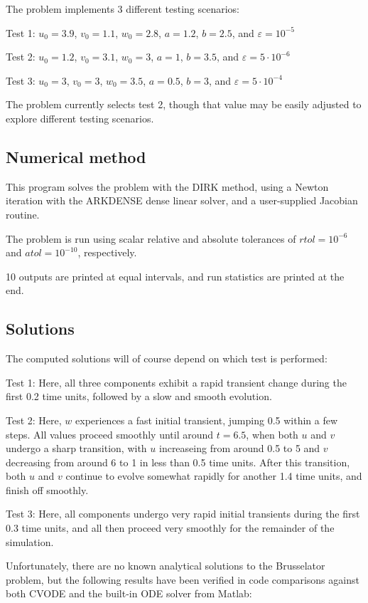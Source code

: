 \documentclass[letterpaper,10pt,english]{sphinxmanual}
\begin{document}
The problem implements 3 different testing scenarios:

Test 1:  $u_0=3.9$,  $v_0=1.1$,  $w_0=2.8$,
$a=1.2$, $b=2.5$, and $\varepsilon=10^{-5}$

Test 2:  $u_0=1.2$, $v_0=3.1$, $w_0=3$, $a=1$,
$b=3.5$, and $\varepsilon=5\cdot10^{-6}$

Test 3:  $u_0=3$, $v_0=3$, $w_0=3.5$, $a=0.5$,
$b=3$, and $\varepsilon=5\cdot10^{-4}$

The problem currently selects test 2, though that value may be easily
adjusted to explore different testing scenarios.


\subsection{Numerical method}
\label{c_serial:id6}
This program solves the problem with the DIRK method, using a
Newton iteration with the ARKDENSE dense linear solver, and a
user-supplied Jacobian routine.

The problem is run using scalar relative and absolute tolerances of
$rtol=10^{-6}$ and $atol=10^{-10}$, respectively.

10 outputs are printed at equal intervals, and run statistics
are printed at the end.


\subsection{Solutions}
\label{c_serial:id7}
The computed solutions will of course depend on which test is
performed:

Test 1:  Here, all three components exhibit a rapid transient change
during the first 0.2 time units, followed by a slow and smooth evolution.

Test 2: Here, $w$ experiences a fast initial transient, jumping
0.5 within a few steps.  All values proceed smoothly until around
$t=6.5$, when both $u$ and $v$ undergo a sharp
transition, with $u$ increaseing from around 0.5 to 5 and
$v$ decreasing from around 6 to 1 in less than 0.5 time units.
After this transition, both $u$ and $v$ continue to evolve
somewhat rapidly for another 1.4 time units, and finish off smoothly.

Test 3: Here, all components undergo very rapid initial transients
during the first 0.3 time units, and all then proceed very smoothly
for the remainder of the simulation.

Unfortunately, there are no known analytical solutions to the
Brusselator problem, but the following results have been verified
in code comparisons against both CVODE and the built-in ODE solver
 from Matlab:
\end{document}
